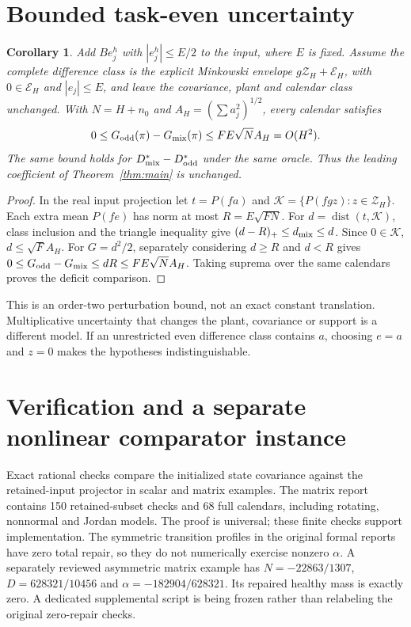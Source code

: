 \documentclass[11pt]{article}
\newtheorem{corollary}{Corollary}
\begin{document}
\section{Bounded task-even uncertainty}
\begin{corollary}\label{cor:even}
Add $Be_j^h$ with $|e_j^h|\le E/2$ to the input, where $E$ is fixed.
Assume the complete difference class is the explicit Minkowski envelope
$g\mathcal Z_H+\mathcal E_H$, with $0\in\mathcal E_H$ and
$|e_j|\le E$, and leave the covariance, plant and calendar class unchanged.
With $N=H+n_0$ and $A_H=(\sum a_j^2)^{1/2}$, every calendar satisfies
\[
0\le G_{\rm odd}(\pi)-G_{\rm mix}(\pi)
\le FE\sqrt N A_H=O(H^2).
\]
The same bound holds for $D_{\rm mix}^*-D_{\rm odd}^*$ under the same oracle.
Thus the leading coefficient of Theorem~\ref{thm:main} is unchanged.
\end{corollary}
\begin{proof}
In the real input projection let $t=P(fa)$ and
$\mathcal K=\{P(fgz):z\in\mathcal Z_H\}$.
Each extra mean $P(fe)$ has norm at most $R=E\sqrt{FN}$.
For $d=\operatorname{dist}(t,\mathcal K)$, class inclusion and the triangle
inequality give $(d-R)_+\le d_{\rm mix}\le d$.
Since $0\in\mathcal K$, $d\le\sqrt F A_H$.
For $G=d^2/2$, separately considering $d\ge R$ and $d<R$ gives
$0\le G_{\rm odd}-G_{\rm mix}\le dR\le FE\sqrt N A_H$.
Taking suprema over the same calendars proves the deficit comparison.
\end{proof}
This is an order-two perturbation bound, not an exact constant translation.
Multiplicative uncertainty that changes the plant, covariance or support is a
different model. If an unrestricted even difference class contains $a$,
choosing $e=a$ and $z=0$ makes the hypotheses indistinguishable.

\section{Verification and a separate nonlinear comparator instance}
Exact rational checks compare the initialized state covariance against the
retained-input projector in scalar and matrix examples. The matrix report
contains 150 retained-subset checks and 68 full calendars, including rotating,
nonnormal and Jordan models. The proof is universal; these finite checks
support implementation. The symmetric transition profiles in the original
formal reports have zero total repair, so they do not numerically exercise
nonzero $\alpha$. A separately reviewed asymmetric matrix example has
$N=-22863/1307$, $D=628321/10456$ and $\alpha=-182904/628321$.
Its repaired healthy mass is exactly zero. A dedicated supplemental script
is being frozen rather than relabeling the original zero-repair checks.
\end{document}
